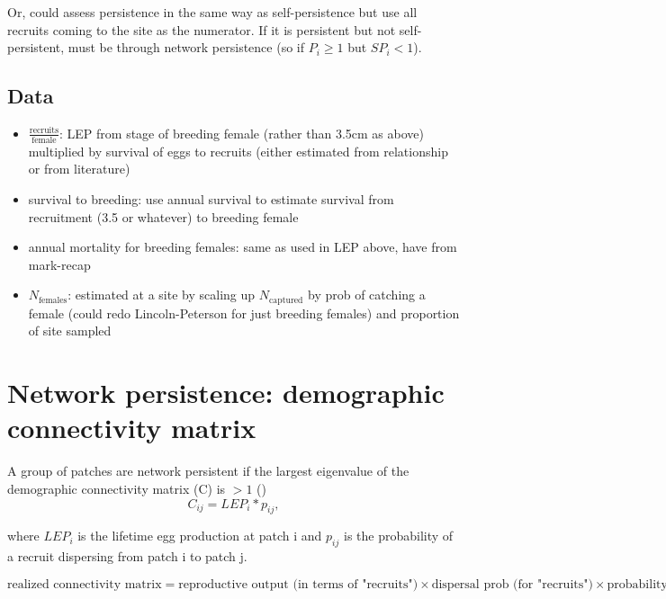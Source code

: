 \documentclass[12pt, oneside]{article}   	%
\begin{document}
Or, could assess persistence in the same way as self-persistence but use all recruits coming to the site as the numerator. If it is persistent but not self-persistent, must be through network persistence (so if $P_i \geq 1$ but $SP_i < 1$).

\subsection*{Data}
\begin{itemize}
	\item $\frac{\text{recruits}}{\text{female}}$: LEP from stage of breeding female (rather than 3.5cm as above) multiplied by survival of eggs to recruits (either estimated from relationship or from literature)
	\item survival to breeding: use annual survival to estimate survival from recruitment (3.5 or whatever) to breeding female
	\item annual mortality for breeding females: same as used in LEP above, have from mark-recap
	\item $N_{\text{females}}$: estimated at a site by scaling up $N_{\text{captured}}$ by prob of catching a female (could redo Lincoln-Peterson for just breeding females) and proportion of site sampled
	\end{itemize}

\section*{Network persistence: demographic connectivity matrix}
A group of patches are network persistent if the largest eigenvalue of the demographic connectivity matrix (C) is $ > 1$ (\cite{burgess2014beyond,lyselpopulation})
\begin{equation}
C_{ij} = LEP_i * p_{ij},
\end{equation}

where $LEP_i$ is the lifetime egg production at patch i and $p_{ij}$ is the probability of a recruit dispersing from patch i to patch j.

\begin{equation}
\text{realized connectivity matrix} = \text{reproductive output (in terms of "recruits")} \times \text{dispersal prob (for "recruits")} \times \text{probability of survival to maturity for females}
\end{equation}


{}



\end{document}
